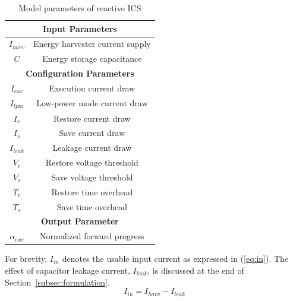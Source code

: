 \begin{table}[!t]
    \renewcommand{\arraystretch}{1.2}
    \centering
    \caption{Model parameters of reactive ICS} 
    \label{tab:parameter}
    \begin{tabular}{|c|c|}
        \hline
        \multicolumn{2}{|c|}{\textbf{Input Parameters}}\\
        \hline
        $I_{harv}$ & Energy harvester current supply\\
        $C$ & Energy storage capacitance\\
        \hline
        \multicolumn{2}{|c|}{\textbf{Configuration Parameters}}\\
        \hline
        $I_{exe}$ & Execution current draw\\
        $I_{lpm}$ & Low-power mode current draw\\
        $I_{r}$ & Restore current draw\\
        $I_{s}$ & Save current draw\\
        $I_{leak}$ & Leakage current draw\\
        $V_{r}$ & Restore voltage threshold\\
        $V_{s}$ & Save voltage threshold\\
        $T_{r}$ & Restore time overhead\\
        $T_{s}$ & Save time overhead\\
        \hline
        \multicolumn{2}{|c|}{\textbf{Output Parameter}}\\
        \hline
        $\alpha_{exe}$ & Normalized forward progress \\ 
        \hline
    \end{tabular}
\end{table}

For brevity, $I_{in}$ denotes the usable input current as expressed in (\ref{eq:in}). The effect of capacitor leakage current, $I_{leak}$, is discussed at the end of Section~\ref{subsec:formulation}.
\begin{equation}
  I_{in} = I_{harv} - I_{leak}
  \label{eq:in}
\end{equation}

